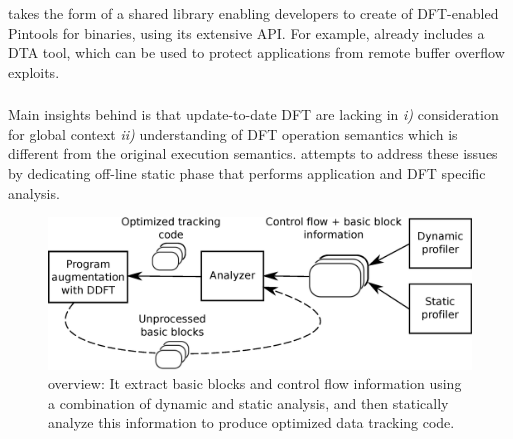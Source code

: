 \libdft takes the form of a shared library enabling developers to create of
DFT-enabled Pintools for binaries, using its extensive API. For example,
\libdft already includes a DTA tool, which can be used to protect applications
from remote buffer overflow exploits.

\subsubsection{\tfa} 

Main insights behind \tfa is that update-to-date DFT are lacking in {\it i)}
consideration for global context {\it ii)} understanding of DFT operation
semantics which is different from the original execution semantics.  \tfa
attempts to address these issues by dedicating off-line static phase that
performs application and DFT specific analysis. 

\begin{figure}[tb]
    \centering
    \includegraphics[width=0.65\linewidth]{figs/overview_model.eps}
    \caption{\tfa overview: It extract basic blocks and control flow
    information using a combination of dynamic and static analysis, and then
    statically analyze this information to produce optimized data tracking
    code.
   \label{fig:approach_overview}}
\end{figure}

